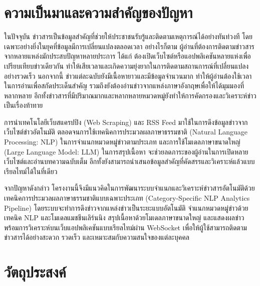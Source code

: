 
\section{ความเป็นมาและความสำคัญของปัญหา}

ในปัจจุบัน ข่าวสารเป็นข้อมูลสำคัญที่ช่วยให้ประชาชนรับรู้และติดตามเหตุการณ์ได้อย่างทันท่วงที โดยเฉพาะอย่างยิ่งในยุคที่ข้อมูลมีการเปลี่ยนแปลงตลอดเวลา อย่างไรก็ตาม ผู้อ่านที่ต้องการติดตามข่าวสารจากหลายแหล่งมักประสบปัญหาหลายประการ ได้แก่ ต้องเปิดเว็บไซต์หรือแอปพลิเคชันหลายแห่งเพื่อเปรียบเทียบข่าวเดียวกัน ทำให้เสียเวลาและเกิดความยุ่งยากในการติดตามสถานการณ์ที่เปลี่ยนแปลงอย่างรวดเร็ว นอกจากนี้ ข่าวแต่ละฉบับยังมีเนื้อหายาวและมีข้อมูลจำนวนมาก ทำให้ผู้อ่านต้องใช้เวลาในการอ่านเพื่อสกัดประเด็นสำคัญ รวมถึงยังต้องอ่านข่าวจากแหล่งภาษาอังกฤษเพื่อให้ได้มุมมองที่หลากหลาย อีกทั้งข่าวสารที่มีปริมาณมากและหลากหลายหมวดหมู่ยังทำให้การคัดกรองและวิเคราะห์ข่าวเป็นเรื่องท้าทาย

การนำเทคโนโลยีเว็บสแครปปิง (Web Scraping) และ RSS Feed มาใช้ในการดึงข้อมูลข่าวจากเว็บไซต์ข่าวอัตโนมัติ ตลอดจนการใช้เทคนิคการประมวลผลภาษาธรรมชาติ (Natural Language Processing: NLP) ในการจำแนกหมวดหมู่ข่าวตามประเภท และการใช้โมเดลภาษาขนาดใหญ่ (Large Language Model: LLM) ในการสรุปเนื้อหา จะช่วยลดภาระของผู้อ่านในการเปิดหลายเว็บไซต์และอ่านบทความฉบับเต็ม อีกทั้งยังสามารถนำเสนอข้อมูลสำคัญที่คัดสรรและวิเคราะห์แล้วแบบเรียลไทม์ได้ในที่เดียว

จากปัญหาดังกล่าว โครงงานนี้จึงมีแนวคิดในการพัฒนาระบบจำแนกและวิเคราะห์ข่าวสารอัตโนมัติด้วยเทคนิคการประมวลผลภาษาธรรมชาติแบบเฉพาะประเภท (Category-Specific NLP Analytics Pipeline) โดยระบบจะทำการดึงข่าวจากแหล่งข่าวเป็นระยะแบบอัตโนมัติ จำแนกหมวดหมู่ข่าวด้วยเทคนิค NLP และโมเดลแมชชีนเลิร์นนิง สรุปเนื้อหาด้วยโมเดลภาษาขนาดใหญ่ และแสดงผลข่าวพร้อมการวิเคราะห์บนเว็บแอปพลิเคชันแบบเรียลไทม์ผ่าน WebSocket เพื่อให้ผู้ใช้สามารถติดตามข่าวสารได้อย่างสะดวก รวดเร็ว และเหมาะสมกับความสนใจของแต่ละบุคคล

\section{วัตถุประสงค์}

